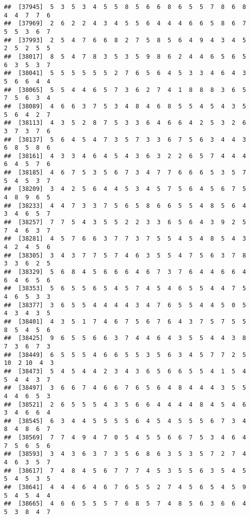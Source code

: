 \documentclass[
]{book}
\begin{document}
\begin{verbatim}
##  [37945]  5  3  5  3  4  5  5  8  5  6  6  8  6  5  5  7  8  6  8  4  4  7  7  6
##  [37969]  2  6  2  2  4  3  4  5  5  6  4  4  4  6  6  5  8  6  7  5  5  3  6  7
##  [37993]  2  5  4  7  6  6  8  2  7  5  8  5  6  4  9  4  3  4  5  2  5  2  5  5
##  [38017]  8  5  4  7  8  3  5  3  5  9  8  6  2  4  4  6  5  6  5  6  3  5  3  7
##  [38041]  5  5  5  5  5  5  2  7  6  5  6  4  5  3  3  4  6  4  3  5  6  6  4  4
##  [38065]  5  5  4  4  6  5  7  3  6  2  7  4  1  8  8  8  3  6  5  7  5  6  3  4
##  [38089]  4  6  6  3  7  5  3  4  8  4  6  8  5  5  4  5  4  3  5  5  6  4  2  7
##  [38113]  4  3  5  2  8  7  5  3  3  6  4  6  6  4  2  5  3  2  6  3  7  3  7  6
##  [38137]  5  6  4  5  4  7  3  5  7  3  3  6  7  5  6  3  4  4  3  6  8  5  8  6
##  [38161]  4  3  3  4  6  4  5  4  3  6  3  2  2  6  5  7  4  4  4  6  4  5  7  6
##  [38185]  4  6  7  5  3  5  6  7  3  4  7  7  6  6  6  5  3  5  7  5  4  5  3  7
##  [38209]  3  4  2  5  6  4  4  5  3  4  5  7  5  6  4  5  6  7  5  4  8  9  6  5
##  [38233]  4  4  7  3  3  7  5  6  5  8  6  6  5  5  4  8  5  6  4  3  4  6  5  7
##  [38257]  7  7  5  4  3  5  5  2  2  3  3  6  5  6  4  3  9  2  5  7  4  6  3  7
##  [38281]  4  5  7  6  6  3  7  7  3  7  5  5  4  5  4  8  5  4  3  4  2  4  5  6
##  [38305]  3  4  3  7  7  5  7  4  6  3  5  5  4  7  5  6  3  7  8  3  3  6  2  5
##  [38329]  5  6  8  4  5  6  6  6  4  6  7  3  7  6  4  4  6  6  4  6  4  6  5  6
##  [38353]  5  6  5  5  6  5  4  5  7  4  5  4  6  5  5  4  4  7  5  4  6  5  3  3
##  [38377]  3  6  5  5  4  4  4  4  3  4  7  6  5  5  4  4  5  0  5  4  3  4  3  5
##  [38401]  4  3  5  1  7  4  6  7  5  6  7  6  4  3  7  5  7  5  5  8  5  4  5  6
##  [38425]  9  6  5  5  6  6  3  7  4  4  6  4  3  5  5  4  4  3  8  7  3  6  7  3
##  [38449]  6  5  5  5  4  6  6  5  5  3  5  6  3  4  5  7  7  2  5 10  2 10  4  3
##  [38473]  5  4  5  4  4  2  3  4  3  6  5  6  6  5  5  4  1  5  4  5  4  4  3  7
##  [38497]  3  6  6  7  4  6  6  7  6  5  6  4  8  4  4  4  3  5  5  4  4  6  5  3
##  [38521]  2  6  5  5  5  4  3  5  6  6  4  4  4  4  8  4  5  4  6  3  4  6  6  4
##  [38545]  6  3  4  4  5  5  5  5  6  4  5  4  5  5  5  6  7  3  4  8  4  8  6  7
##  [38569]  7  7  4  9  4  7  0  5  4  5  5  6  6  7  5  3  4  6  4  7  5  6  5  6
##  [38593]  3  4  3  6  3  7  3  5  6  8  6  3  5  3  5  7  2  7  4  4  6  3  5  7
##  [38617]  7  4  8  4  5  6  7  7  7  4  5  3  5  5  6  3  5  4  5  5  4  5  3  5
##  [38641]  4  4  4  6  4  6  7  6  5  5  2  7  4  5  6  5  4  5  9  5  4  5  4  4
##  [38665]  4  6  6  5  5  5  7  6  8  5  7  4  8  5  6  3  6  6  4  5  3  8  4  7

\end{verbatim}
\end{document}
